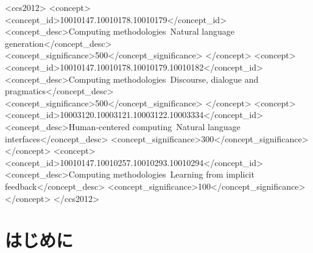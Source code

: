 \documentclass[manuscript,review,anonymous]{acmart}
\begin{document}
\begin{CCSXML}
<ccs2012>
 <concept>
  <concept_id>10010147.10010178.10010179</concept_id>
  <concept_desc>Computing methodologies~Natural language generation</concept_desc>
  <concept_significance>500</concept_significance>
 </concept>
 <concept>
  <concept_id>10010147.10010178.10010179.10010182</concept_id>
  <concept_desc>Computing methodologies~Discourse, dialogue and pragmatics</concept_desc>
  <concept_significance>500</concept_significance>
 </concept>
 <concept>
  <concept_id>10003120.10003121.10003122.10003334</concept_id>
  <concept_desc>Human-centered computing~Natural language interfaces</concept_desc>
  <concept_significance>300</concept_significance>
 </concept>
 <concept>
  <concept_id>10010147.10010257.10010293.10010294</concept_id>
  <concept_desc>Computing methodologies~Learning from implicit feedback</concept_desc>
  <concept_significance>100</concept_significance>
 </concept>
</ccs2012>
\end{CCSXML}



\maketitle


\section{はじめに}
\label{sec:intro}
\end{document}
